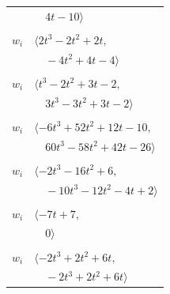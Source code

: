 \documentclass[11pt]{article}
\begin{document}
\begin{longtable}{@{}ll@{}}
 & $\quad 4t-10\rangle$\\
\addlinespace[2pt]
\multicolumn{2}{@{}p{0.97\textwidth}@{}}{$i=24$, $D_i=1$, $\rho_{ij}$: $0{:}1, \allowbreak 7{:}2, \allowbreak 12{:}1, \allowbreak 18{:}1, \allowbreak 21{:}1, \allowbreak 22{:}2, \allowbreak 27{:}1, \allowbreak 28{:}1$}\\
$w_i$ & $\langle 2t^{3}-2t^{2}+2t,$\\
 & $\quad -4t^{2}+4t-4\rangle$\\
\addlinespace[2pt]
\multicolumn{2}{@{}p{0.97\textwidth}@{}}{$i=25$, $D_i=1$, $\rho_{ij}$: $4{:}1, \allowbreak 5{:}2, \allowbreak 8{:}1, \allowbreak 9{:}1, \allowbreak 18{:}2, \allowbreak 20{:}2, \allowbreak 33{:}1$}\\
$w_i$ & $\langle t^{3}-2t^{2}+3t-2,$\\
 & $\quad 3t^{3}-3t^{2}+3t-2\rangle$\\
\addlinespace[2pt]
\multicolumn{2}{@{}p{0.97\textwidth}@{}}{$i=26$, $D_i=1$, $\rho_{ij}$: $4{:}2, \allowbreak 12{:}1, \allowbreak 16{:}1, \allowbreak 18{:}2, \allowbreak 20{:}2, \allowbreak 22{:}2, \allowbreak 23{:}1, \allowbreak 28{:}2, \allowbreak 29{:}1, \allowbreak 35{:}1$}\\
$w_i$ & $\langle -6t^{3}+52t^{2}+12t-10,$\\
 & $\quad 60t^{3}-58t^{2}+42t-26\rangle$\\
\addlinespace[2pt]
\multicolumn{2}{@{}p{0.97\textwidth}@{}}{$i=27$, $D_i=1$, $\rho_{ij}$: $6{:}1, \allowbreak 9{:}2, \allowbreak 19{:}2, \allowbreak 21{:}2, \allowbreak 23{:}1, \allowbreak 24{:}2, \allowbreak 28{:}2, \allowbreak 32{:}2$}\\
$w_i$ & $\langle -2t^{3}-16t^{2}+6,$\\
 & $\quad -10t^{3}-12t^{2}-4t+2\rangle$\\
\addlinespace[2pt]
\multicolumn{2}{@{}p{0.97\textwidth}@{}}{$i=28$, $D_i=1$, $\rho_{ij}$: $6{:}1, \allowbreak 10{:}1, \allowbreak 12{:}1, \allowbreak 13{:}2, \allowbreak 16{:}1, \allowbreak 17{:}1, \allowbreak 19{:}1, \allowbreak 24{:}2, \allowbreak 26{:}1, \allowbreak 27{:}1$}\\
$w_i$ & $\langle -7t+7,$\\
 & $\quad 0\rangle$\\
\addlinespace[2pt]
\multicolumn{2}{@{}p{0.97\textwidth}@{}}{$i=29$, $D_i=1$, $\rho_{ij}$: $1{:}1, \allowbreak 7{:}2, \allowbreak 26{:}2, \allowbreak 35{:}2$}\\
$w_i$ & $\langle -2t^{3}+2t^{2}+6t,$\\
 & $\quad -2t^{3}+2t^{2}+6t\rangle$\\

\end{longtable}
\end{document}
